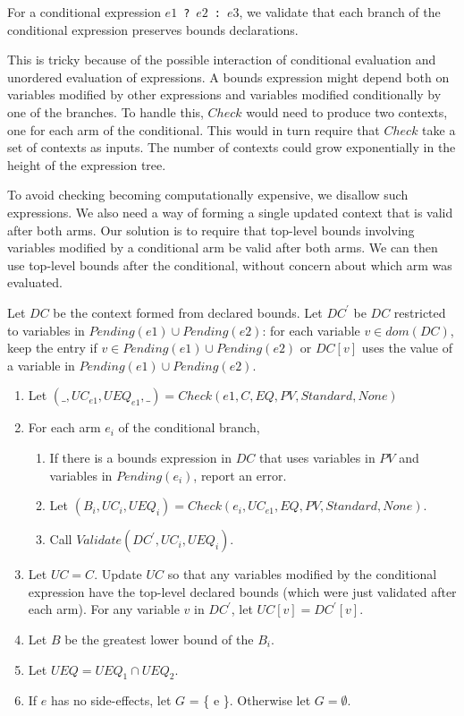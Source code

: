 For a conditional expression $e1$~\lstinline+?+~$e2$~\lstinline+:+~$e3$, we validate that each branch
of the conditional expression preserves bounds declarations.

This is tricky
because of the possible interaction of conditional evaluation and unordered evaluation
of expressions.  A bounds expression might depend both on variables modified 
by other expressions and variables modified conditionally by one of the
branches.  To handle this, $Check$ would need to produce two contexts, one
for each arm of the conditional. This would in turn
require that $Check$ take a set of contexts as inputs.  The number of contexts could
grow exponentially in the height of the expression tree.

To avoid checking becoming computationally expensive, we disallow such expressions.
We also need a way of forming a single updated context that is valid after both arms.
Our solution is to require that top-level bounds involving variables modified by a conditional arm
be valid after both arms.   We can then use top-level bounds after the conditional, without
concern about which arm was evaluated.

Let $DC$ be the context formed from declared bounds.
Let $DC^\prime$ be $DC$ restricted to variables in $Pending(e1) \cup Pending(e2)$:
for each variable $v \in dom(DC)$, keep the entry if $v \in Pending(e1) \cup Pending(e2)$
or $DC[v]$ uses the value of a variable in $Pending(e1) \cup Pending(e2)$.
\begin{enumerate}
\item Let $(\_, {UC}_{e1}, {UEQ}_{e1}, \_)= Check(e1, C, EQ, PV, Standard, None)$
\item For each arm $e_i$ of the conditional branch,
\begin{enumerate}
\item If there is a bounds expression in $DC$ that uses variables in $PV$ and
variables in $Pending(e_i)$, report an error.
\item Let $(B_i, {UC}_i, {UEQ}_i) = Check(e_i, {UC}_{e1}, EQ, PV, Standard, None)$.
\item Call $Validate(DC^\prime, {UC}_i, {UEQ}_i)$.
\end{enumerate}
\item Let $UC = C$.  Update $UC$ so that any variables modified by the conditional expression
have the top-level declared bounds (which were just validated after each arm).
For any variable $v$ in $DC^\prime$, let $UC[v] = DC^\prime[v]$.
\item Let $B$ be the greatest lower bound of the $B_i$.
\item Let $UEQ = {UEQ}_1 \cap {UEQ}_2$.
\item If $e$ has no side-effects, let $G$ = \{ e \}.  Otherwise let $G=\emptyset$.
\end{enumerate}

